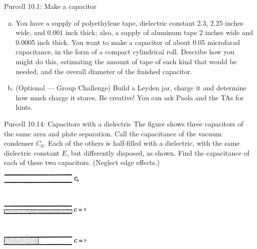 \documentclass{esg8022pset}
\begin{document}
\begin{problem}{Purcell 10.1: Make a capacitor}
  \begin{enumerate}[(a)]
    \item You have a supply of polyethylene tape, dielectric constant 
      2.3, 2.25 inches wide, and 0.001 inch thick; also, a supply of aluminum 
      tape 2 inches wide and 0.0005 inch thick. You want to make a capacitor
      of about 0.05 microfarad capacitance, in the form of a compact 
      cylindrical roll. Describe how you might do this, estimating the 
      amount of tape of each kind that would be needed, and the overall 
      diameter of the finished capacitor. 
    \item (Optional --- Group Challenge) Build a Leyden jar, charge it
      and determine how much charge it stores. Be creative!  You can ask
      Paola and the TAs for hints.
  \end{enumerate}
\end{problem}
\begin{solution}

\end{solution}






\begin{problem}{Purcell 10.14: Capacitors with a dielectric}
  The figure shows three capacitors of the same area and plate 
  separation. Call the capacitance of the vacuum condenser $C_0$. Each of 
  the others is half-filled with a dielectric, with the same dielectric constant
  $E$, but differently disposed, as shown. Find the capacitance of 
  each of these two capacitors. (Neglect edge effects.)
  \begin{center}\includegraphics[width=0.33\textwidth]{ps04_08}\end{center}
\end{problem}
\begin{solution}

\end{solution}
\end{document}
